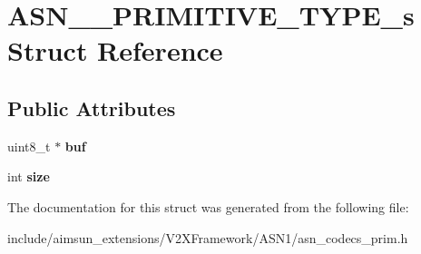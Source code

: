 \hypertarget{structASN____PRIMITIVE__TYPE__s}{}\section{A\+S\+N\+\_\+\+\_\+\+P\+R\+I\+M\+I\+T\+I\+V\+E\+\_\+\+T\+Y\+P\+E\+\_\+s Struct Reference}
\label{structASN____PRIMITIVE__TYPE__s}
\subsection*{Public Attributes}
\begin{DoxyCompactItemize}
\item 
uint8\+\_\+t $\ast$ {\bfseries buf}\hypertarget{structASN____PRIMITIVE__TYPE__s_abbed92744485c707cd8f6aa0febd9aca}{}\label{structASN____PRIMITIVE__TYPE__s_abbed92744485c707cd8f6aa0febd9aca}

\item 
int {\bfseries size}\hypertarget{structASN____PRIMITIVE__TYPE__s_afbb682e668a2f49304b4856e664af65e}{}\label{structASN____PRIMITIVE__TYPE__s_afbb682e668a2f49304b4856e664af65e}

\end{DoxyCompactItemize}


The documentation for this struct was generated from the following file\+:\begin{DoxyCompactItemize}
\item 
include/aimsun\+\_\+extensions/\+V2\+X\+Framework/\+A\+S\+N1/asn\+\_\+codecs\+\_\+prim.\+h\end{DoxyCompactItemize}
